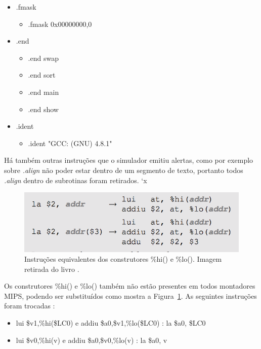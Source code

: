 \documentclass[12pt]{article}
\begin{document}
\begin{itemize}
\item .fmask\\
  \begin{itemize}
  \item .fmask	0x00000000,0
  \end{itemize}
\item .end\\
  \begin{itemize}
  \item .end swap
  \item .end sort
  \item .end main
  \item .end show
  \end{itemize}
\item .ident\\
  \begin{itemize}
  \item .ident "GCC: (GNU) 4.8.1"
  \end{itemize}
\end{itemize}

Há também outras instruções que o simulador emitiu alertas, como por exemplo sobre \textit{.align} não poder estar dentro de um segmento de texto, portanto todos \textit{.align} dentro de subrotinas foram retirados.
`x
\begin{figure}[H]
	\centering
	\includegraphics[width=1\textwidth]{hilo.png}
	\caption{Instruções equivalentes dos construtores \%hi() e \%lo(). Imagem retirada do livro \cite{mipsrun}.}
	\label{fig:hilo}
\end{figure}

Os construtores \%hi() e \%lo() também não estão presentes em todos montadores MIPS, podendo ser substituídos como mostra a Figura~\ref{fig:hilo}. As seguintes instruções foram trocadas :

\begin{itemize}
	\item lui \$v1,\%hi(\$LC0) e addiu \$a0,\$v1,\%lo(\$LC0) : la \$a0, \$LC0
    \item lui \$v0,\%hi(v) e addiu \$a0,\$v0,\%lo(v) : la \$a0, v
\end{itemize}
\end{document}
